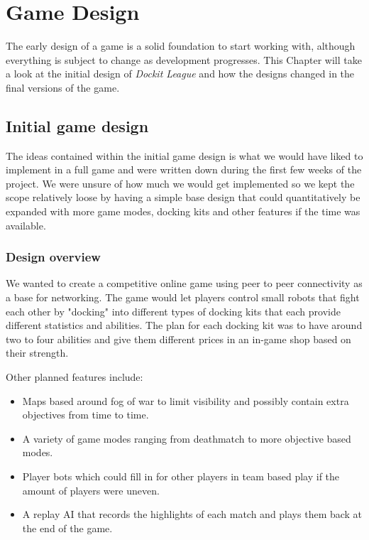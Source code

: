 \chapter{Game Design}
\label{chap:gamedesign}
The early design of a game is a solid foundation to start working with, although everything is subject to change as development progresses. This Chapter will take a look at the initial design of \emph{Dockit League} and how the designs changed in the final versions of the game. 

\section{Initial game design}
The ideas contained within the initial game design is what we would have liked to implement in a full game and were written down during the first few weeks of the project. We were unsure of how much we would get implemented so we kept the scope relatively loose by having a simple base design that could quantitatively be expanded with more game modes, docking kits and other features if the time was available. 

\subsection{Design overview}
We wanted to create a competitive online game using peer to peer connectivity as a base for networking. The game would let players control small robots that fight each other by "docking" into different types of docking kits that each provide different statistics and abilities. The plan for each docking kit was to have around two to four abilities and give them different prices in an in-game shop based on their strength. 

Other planned features include:
\begin{itemize}
    \item Maps based around fog of war to limit visibility and possibly contain extra objectives from time to time.
    \item A variety of game modes ranging from deathmatch to more objective based modes. 
    \item Player bots which could fill in for other players in team based play if the amount of players were uneven. 
    \item A replay AI that records the highlights of each match and plays them back at the end of the game.
\end{itemize}
    
